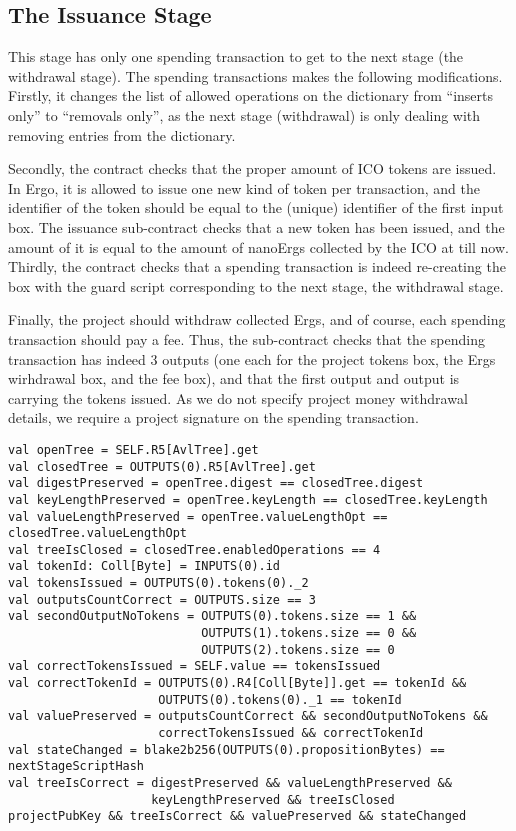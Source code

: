 \documentclass[11pt]{article}
\begin{document}
\subsection{The Issuance Stage}
This stage has only one spending transaction to get to the next stage (the withdrawal stage). The spending transactions makes the following modifications. Firstly, it changes the list of allowed operations on the dictionary from ``inserts only'' to ``removals only'', as the next stage (withdrawal) is only dealing with removing entries from the dictionary.

Secondly, the contract checks that the proper amount of ICO tokens are issued. In Ergo, it is allowed to issue one new kind of token per transaction, and the identifier of the token should be equal to the (unique) identifier of the first input box. The issuance sub-contract checks that a new token has been issued, and the amount of it is equal to the amount of nanoErgs collected by the ICO at till now. Thirdly, the contract checks that a spending transaction is indeed re-creating the box with the guard script corresponding to the next stage, the withdrawal stage.

Finally, the project should withdraw collected Ergs, and of course, each spending transaction should pay a fee. Thus, the sub-contract checks that the spending transaction has indeed 3 outputs (one each for the project tokens box, the Ergs wirhdrawal box, and the fee box), and that the first output and output is carrying the tokens issued. As we do not specify project money withdrawal details, we require a project signature on the spending transaction.

\begin{verbatim}
val openTree = SELF.R5[AvlTree].get
val closedTree = OUTPUTS(0).R5[AvlTree].get
val digestPreserved = openTree.digest == closedTree.digest
val keyLengthPreserved = openTree.keyLength == closedTree.keyLength
val valueLengthPreserved = openTree.valueLengthOpt == closedTree.valueLengthOpt
val treeIsClosed = closedTree.enabledOperations == 4
val tokenId: Coll[Byte] = INPUTS(0).id
val tokensIssued = OUTPUTS(0).tokens(0)._2
val outputsCountCorrect = OUTPUTS.size == 3
val secondOutputNoTokens = OUTPUTS(0).tokens.size == 1 && 
                           OUTPUTS(1).tokens.size == 0 && 
                           OUTPUTS(2).tokens.size == 0
val correctTokensIssued = SELF.value == tokensIssued
val correctTokenId = OUTPUTS(0).R4[Coll[Byte]].get == tokenId &&
                     OUTPUTS(0).tokens(0)._1 == tokenId
val valuePreserved = outputsCountCorrect && secondOutputNoTokens && 
                     correctTokensIssued && correctTokenId
val stateChanged = blake2b256(OUTPUTS(0).propositionBytes) == nextStageScriptHash
val treeIsCorrect = digestPreserved && valueLengthPreserved && 
                    keyLengthPreserved && treeIsClosed
projectPubKey && treeIsCorrect && valuePreserved && stateChanged
\end{verbatim}
\end{document}
